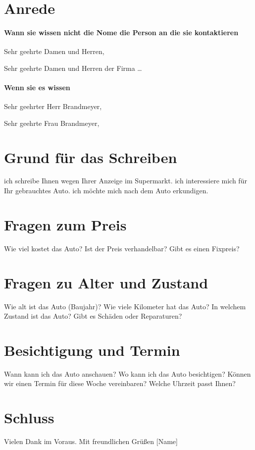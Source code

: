 \documentclass[a4paper]{article}
\title{}
\date{}
\begin{document}
    \maketitle
    
    
    \section{Anrede}
        
        \paragraph{Wann sie wissen nicht die Nome die Person an die sie kontaktieren}
            Sehr geehrte Damen und Herren,
            
            Sehr geehrte Damen und Herren der Firma …
        
        \paragraph{Wenn sie es wissen}
            Sehr geehrter Herr Brandmeyer,
            
            Sehr geehrte Frau Brandmeyer,
    
    
    \section{Grund für das Schreiben}
    ich schreibe Ihnen wegen Ihrer Anzeige im Supermarkt.
    ich interessiere mich für Ihr gebrauchtes Auto.
    ich möchte mich nach dem Auto erkundigen.
    
    
    \section{Fragen zum Preis}
    Wie viel kostet das Auto?
    Ist der Preis verhandelbar?
    Gibt es einen Fixpreis?
    
    
    \section{Fragen zu Alter und Zustand}
    Wie alt ist das Auto (Baujahr)?
    Wie viele Kilometer hat das Auto?
    In welchem Zustand ist das Auto?
    Gibt es Schäden oder Reparaturen?
    
    
    \section{Besichtigung und Termin}
    Wann kann ich das Auto anschauen?
    Wo kann ich das Auto besichtigen?
    Können wir einen Termin für diese Woche vereinbaren?
    Welche Uhrzeit passt Ihnen?
    
    
    \section{Schluss}
    Vielen Dank im Voraus.
    Mit freundlichen Grüßen
    [Name]
\end{document}
